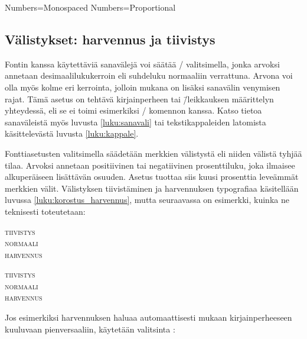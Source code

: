 \begin{koodilohkosis}
Numbers=Monospaced   %
Numbers=Proportional %
\end{koodilohkosis}

\subsection{Välistykset: harvennus ja tiivistys}
\label{luku:fontit_valistys}

Fontin kanssa käytettäviä sanavälejä voi säätää \-/
valitsimella, jonka arvoksi annetaan desimaalilukukerroin eli suhdeluku
normaaliin verrattuna. Arvona voi olla myös kolme eri kerrointa, jolloin
mukana on lisäksi sanavälin venymisen rajat. Tämä asetus on tehtävä
kirjainperheen tai \=/leikkauksen määrittelyn yhteydessä, eli se ei
toimi esimerkiksi \-/ komennon kanssa. Katso
tietoa sanaväleistä myös luvusta \ref{luku:sanavali} tai
tekstikappaleiden latomista käsittelevästä luvusta \ref{luku:kappale}.
\noclub[2]

Fonttiasetusten valitsimella  säädetään merkkien
välistystä eli niiden välistä tyhjää tilaa. Arvoksi annetaan
positiivinen tai negatiivinen prosenttiluku, joka ilmaisee alkuperäiseen
lisättävän osuuden. Asetus  tuottaa siis
kuusi prosenttia leveämmät merkkien välit. Välistyksen tiivistäminen ja
harvennuksen typografiaa käsitellään luvussa
\ref{luku:korostus_harvennus}, mutta seuraavassa on esimerkki, kuinka ne
teknisesti toteutetaan:

\begin{koodilohkosis}
\scshape { tiivistys} \\
normaali \\ { harvennus}
\end{koodilohkosis}

\begin{tulossis}
  \scshape { tiivistys} \\
  normaali \\ { harvennus}
\end{tulossis}

Jos esimerkiksi harvennuksen haluaa automaattisesti mukaan
kirjainperheeseen kuuluvaan pienversaaliin, käytetään valitsinta
:

